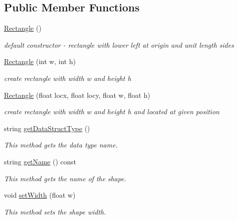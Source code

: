 \subsection*{Public Member Functions}
\begin{DoxyCompactItemize}
\item 
\hyperlink{classbridges_1_1datastructure_1_1_rectangle_a83c7e793c1335073c2a7093bbcf0c5bb}{Rectangle} ()
\begin{DoxyCompactList}\small\item\em default constructor -\/ rectangle with lower left at origin and unit length sides \end{DoxyCompactList}\item 
\hyperlink{classbridges_1_1datastructure_1_1_rectangle_a6e76090c00b4db625e96e4e23015acba}{Rectangle} (int w, int h)
\begin{DoxyCompactList}\small\item\em create rectangle with width w and height h \end{DoxyCompactList}\item 
\hyperlink{classbridges_1_1datastructure_1_1_rectangle_a65c907743708bbbece5ce86a935208a3}{Rectangle} (float locx, float locy, float w, float h)
\begin{DoxyCompactList}\small\item\em create rectangle with width w and height h and located at given position \end{DoxyCompactList}\item 
string \hyperlink{classbridges_1_1datastructure_1_1_rectangle_a0c3b70d1d4d8ea9879eeb70a45c68d5a}{get\+Data\+Struct\+Type} ()
\begin{DoxyCompactList}\small\item\em This method gets the data type name. \end{DoxyCompactList}\item 
string \hyperlink{classbridges_1_1datastructure_1_1_rectangle_aee4fa283fa95e8c3b9f8efd5b19427b8}{get\+Name} () const
\begin{DoxyCompactList}\small\item\em This method gets the name of the shape. \end{DoxyCompactList}\item 
void \hyperlink{classbridges_1_1datastructure_1_1_rectangle_a7f6182e74816a6c7cf83ae49d5ed55be}{set\+Width} (float w)
\begin{DoxyCompactList}\small\item\em This method sets the shape width. \end{DoxyCompactList}\item 

\end{DoxyCompactItemize}
